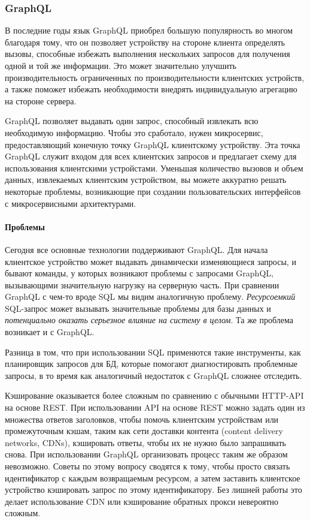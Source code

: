 \documentclass[%
	11pt,
	a4paper,
	utf8,
		]{article}
\begin{document}
\subsubsection{GraphQL}

В последние годы язык GraphQL приобрел большую популярность во многом благодаря тому, что он позволяет устройству на стороне клиента определять вызовы, способные избежать выполнения нескольких запросов для получения одной и той же информации. Это может значительно улучшить производительность ограниченных по производительности клиентских устройств, а также поможет избежать необходимости внедрять индивидуальную агрегацию на стороне сервера.

GraphQL позволяет выдавать один запрос, способный извлекать всю необходимую информацию. Чтобы это сработало, нужен микросервис, предоставляющий конечную точку GraphQL клиентскому устройству. Эта точка GraphQL служит входом для всех клиентских запросов и предлагает схему для использования клиентскими устройстами. Уменьшая количество вызовов и объем данных, извлекаемых клиентским устройством, вы можете аккуратно решать некоторые проблемы, возникающие при создании пользовательских интерфейсов с микросервисными архитектурами.

\paragraph{Проблемы} Сегодня все основные технологии поддерживают GraphQL. Для начала клиентское устройство может выдавать динамически изменяющиеся запросы, и бывают команды, у которых возникают проблемы с запросами GraphQL, вызывающими значительную нагрузку на серверную часть. При сравнении GraphQL с чем-то вроде SQL мы видим аналогичную проблему. {\color{red}\emph{Ресурсоемкий} SQL-запрос может вызывать значительные проблемы для базы данных и \emph{потенциально оказать серьезное влияние на систему в целом}. Та же проблема возникает и с GraphQL.}

Разница в том, что при использовании SQL применются такие инструменты, как планировщик запросов для БД, которые помогают диагностировать проблемные запросы, в то время как аналогичный недостаток с GraphQL сложнее отследить.

Кэширование оказывается более сложным по сравнению с обычными HTTP-API на основе REST. При использовании API на основе REST можно задать один из множества ответов заголовков, чтобы помочь клиентским устройствам или промежуточным кэшам, таким как сети доставки контента (content delivery networks, CDNs), кэшировать ответы, чтобы их не нужно было запрашивать снова. При использовании GraphQL организовать процесс таким же образом невозможно. Советы по этому вопросу сводятся к тому, чтобы просто связать идентификатор с каждым возвращаемым ресурсом, а затем заставить клиентское устройство кэшировать запрос по этому идентификатору. {\color{red}Без лишней работы это делает использование CDN или кэширование обратных прокси невероятно сложным.}
\end{document}
